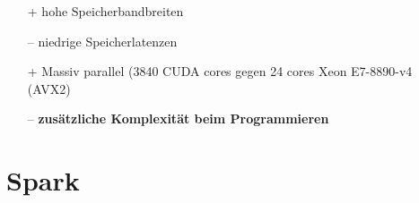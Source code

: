 \begin{frame}
\begin{itemize}
        \item[+] hohe Speicherbandbreiten
        \item[–] niedrige Speicherlatenzen
        \item[+] Massiv parallel (3840 CUDA cores gegen 24 cores Xeon E7-8890-v4 (AVX2)
        \item[–] \textbf{zusätzliche Komplexität beim Programmieren}
    \end{itemize}
\end{frame}



\section{Spark}



